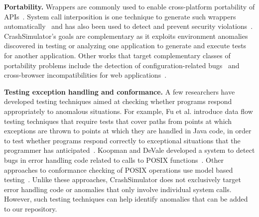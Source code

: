 \noindent
{\bf Portability.}
Wrappers are commonly used to enable cross-platform portability of
APIs~\cite{bartolomeicompliance}. System call interposition is one
technique to generate such wrappers
automatically~\cite{Guo:2011:CUS:2002181.2002202} and has also been
used to detect and prevent security
violations~\cite{Hofmeyr:1998:IDU:1298081.1298084,
  Acharya:2000:MUP:1251306.1251307}.  CrashSimulator's goals are
complementary as it exploits environment anomalies discovered in
testing or analyzing one application to generate and execute tests for
another application.
%
Other works that target complementary classes of portability problems
include the detection of configuration-related
bugs~\cite{skoll:icse:2004, Yilmaz:issta:2004, Fouche:issta:2009,
  Kastner12, Nguyen14} and
cross-browser incompatibilities for web
applications~\cite{DBLP:conf/icsm/ChoudharyVO10, silakov2010improving,
  DBLP:conf/icse/Choudhary11, Mesbah:2011:ACC:1985793.1985870,
  DBLP:conf/icst/DallmeierP0MZ14}.


\noindent
{\bf Testing exception handling and conformance.}
A few researchers have developed testing techniques aimed at checking
whether programs respond appropriately to anomalous situations.  For
example, Fu et al. introduce data flow testing techniques that require
tests that cover paths from points at which exceptions are thrown to
points at which they are handled in Java code, in order to test
whether programs respond correctly to exceptional situations that the
programmer has anticipated~\cite{DBLP:journals/tse/FuMRW05}.  Koopman
and DeVale developed a system to detect bugs in error handling code
related to calls to POSIX functions~\cite{Koopman00theexception}.
%
Other approaches to conformance checking of POSIX operations use model
based testing~\cite{Dadeau:2008:CSM:1433121.1433137,Farchi02}.
%
Unlike these approaches, CrashSimulator does not exclusively
target error handling code or anomalies that only involve individual
system calls. However, such testing techniques can help identify
anomalies that can be added to our repository.


